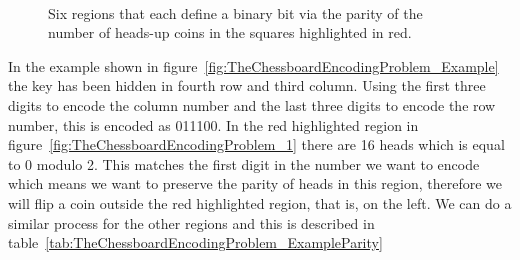 \begin{figure}[H]
	\begin{center}
		\begin{tikzpicture}[scale=0.6]
			
		\end{tikzpicture}\hspace{5mm}
		\begin{tikzpicture}[scale=0.6]
			
		\end{tikzpicture}\hspace{5mm}
		\begin{tikzpicture}[scale=0.6]
			
		\end{tikzpicture}\vspace{6mm}
		\\
		\begin{tikzpicture}[scale=0.6]
			
		\end{tikzpicture}\hspace{5mm}
		\begin{tikzpicture}[scale=0.6]
			
		\end{tikzpicture}\hspace{5mm}
		\begin{tikzpicture}[scale=0.6]
			
		\end{tikzpicture}
	\end{center}
	\caption{Six regions that each define a binary bit via the parity of the number of heads-up coins in the squares highlighted in red.}
	\label{fig:TheChessboardEncodingProblem_Grids}
\end{figure}

In the example shown in figure~\ref{fig:TheChessboardEncodingProblem_Example} the key has been hidden in fourth row and third column. Using the first three digits to encode the column number and the last three digits to encode the row number, this is encoded as 011100. In the red highlighted region in figure~\ref{fig:TheChessboardEncodingProblem_1} there are 16 heads which is equal to 0 modulo 2. This matches the first digit in the number we want to encode which means we want to preserve the parity of heads in this region, therefore we will flip a coin outside the red highlighted region, that is, on the left. We can do a similar process for the other regions and this is described in table~\ref{tab:TheChessboardEncodingProblem_ExampleParity}

